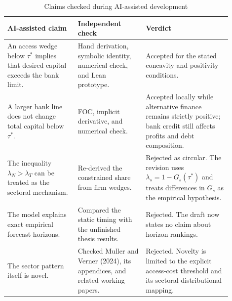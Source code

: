 \documentclass[11pt]{article}
\theoremstyle{definition}
\theoremstyle{remark}
\begin{document}
\begin{table}[ht]
\centering
\small
\caption{Claims checked during AI-assisted development}
\begin{tabular}{p{0.29\linewidth}p{0.27\linewidth}p{0.34\linewidth}}
\toprule
AI-assisted claim & Independent check & Verdict \\
\midrule
An access wedge below $\tau^*$ implies that desired capital exceeds the bank
limit. & Hand derivation, symbolic identity, numerical check, and Lean
prototype. & Accepted for the stated concavity and positivity conditions. \\
A larger bank line does not change total capital below $\tau^*$. & FOC,
implicit derivative, and numerical check. & Accepted locally while alternative
finance remains strictly positive; bank credit still affects profits and debt
composition. \\
The inequality $\lambda_N>\lambda_T$ can be treated as the sectoral mechanism.
& Re-derived the constrained share from firm wedges. & Rejected as circular.
The revision uses $\lambda_s=1-G_s(\tau^*)$ and treats differences in $G_s$ as
the empirical hypothesis. \\
The model explains exact empirical forecast horizons. & Compared the static
timing with the unfinished thesis results. & Rejected. The draft now states
no claim about horizon rankings. \\
The sector pattern itself is novel. & Checked Muller and Verner (2024), its
appendices, and related working papers. & Rejected. Novelty is limited to the
explicit access-cost threshold and its sectoral distributional mapping. \\
\bottomrule
\end{tabular}
\end{table}
\end{document}
